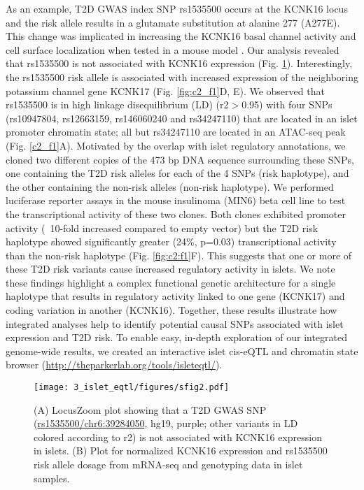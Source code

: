 As an example, T2D GWAS index SNP rs1535500 occurs at the KCNK16 locus and the risk allele results in a glutamate substitution at alanine 277 (A277E). This change was implicated in increasing the KCNK16 basal channel activity and cell surface localization when tested in a mouse model \cite{vierraTypeDiabetesAssociated2015}. Our analysis revealed that rs1535500 is not associated with KCNK16 expression (Fig. \ref{fig:c2_sf2}). Interestingly, the rs1535500 risk allele is associated with increased expression of the neighboring potassium channel gene KCNK17 (Fig. \ref{fig:c2_f1}D, E).  We observed that rs1535500 is in high linkage disequilibrium (LD) (r2$>$0.95) with four SNPs (rs10947804, rs12663159, rs146060240 and rs34247110) that are located in an islet promoter chromatin state; all but rs34247110 are located in an ATAC-seq peak (Fig. \ref{c2_f1}A).  Motivated by the overlap with islet regulatory annotations, we cloned two different copies of the 473 bp DNA sequence surrounding these SNPs, one containing the T2D risk alleles for each of the 4 SNPs (risk haplotype), and the other containing the non-risk alleles (non-risk haplotype). We performed luciferase reporter assays in the mouse insulinoma (MIN6) beta cell line to test the transcriptional activity of these two clones. Both clones exhibited promoter activity (~10-fold increased compared to empty vector) but the T2D risk haplotype showed significantly greater (24\%, p=0.03) transcriptional activity than the non-risk haplotype (Fig. \ref{fig:c2:f1}F). This suggests that one or more of these T2D risk variants cause increased regulatory activity in islets. We note these findings highlight a complex functional genetic architecture for a single haplotype that results in regulatory activity linked to one gene (KCNK17) and coding variation in another (KCNK16). Together, these results illustrate how integrated analyses help to identify potential causal SNPs associated with islet expression and T2D risk. To enable easy, in-depth exploration of our integrated genome-wide results, we created an interactive islet cis-eQTL and chromatin state browser (\url{http://theparkerlab.org/tools/isleteqtl/}).

\begin{figure}
    \centering
    \texttt{[image: 3\_islet\_eqtl/figures/sfig2.pdf]}
    \caption{(A) LocusZoom plot showing that a T2D GWAS SNP (\url{rs1535500/chr6:39284050}, hg19, purple; other variants in LD colored according to r2) is not associated with KCNK16 expression in islets. (B) Plot for normalized KCNK16 expression and rs1535500 risk allele dosage from mRNA-seq and genotyping data in islet samples.}
    \label{fig:c2_sf2}
\end{figure}

